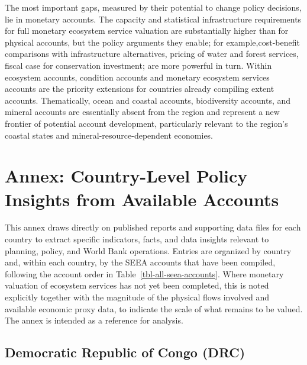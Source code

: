 \documentclass[
  letterpaper,
  DIV=11,
  numbers=noendperiod]{scrartcl}
\begin{document}
The most important gaps, measured by their potential to change policy
decisions, lie in monetary accounts. The capacity and statistical
infrastructure requirements for full monetary ecosystem service
valuation are substantially higher than for physical accounts, but the
policy arguments they enable; for example,cost-benefit comparisons with
infrastructure alternatives, pricing of water and forest services,
fiscal case for conservation investment; are more powerful in turn.
Within ecosystem accounts, condition accounts and monetary ecosystem
services accounts are the priority extensions for countries already
compiling extent accounts. Thematically, ocean and coastal accounts,
biodiversity accounts, and mineral accounts are essentially absent from
the region and represent a new frontier of potential account
development, particularly relevant to the region's coastal states and
mineral-resource-dependent economies.

\section{Annex: Country-Level Policy Insights from Available
Accounts}\label{annex-country-level-policy-insights-from-available-accounts}

This annex draws directly on published reports and supporting data files
for each country to extract specific indicators, facts, and data
insights relevant to planning, policy, and World Bank operations.
Entries are organized by country and, within each country, by the SEEA
accounts that have been compiled, following the account order in
Table~\ref{tbl-all-seea-accounts}. Where monetary valuation of ecosystem
services has not yet been completed, this is noted explicitly together
with the magnitude of the physical flows involved and available economic
proxy data, to indicate the scale of what remains to be valued. The
annex is intended as a reference for analysis.

\subsection{Democratic Republic of Congo (DRC)}\label{sec-annex-drc}
\end{document}
